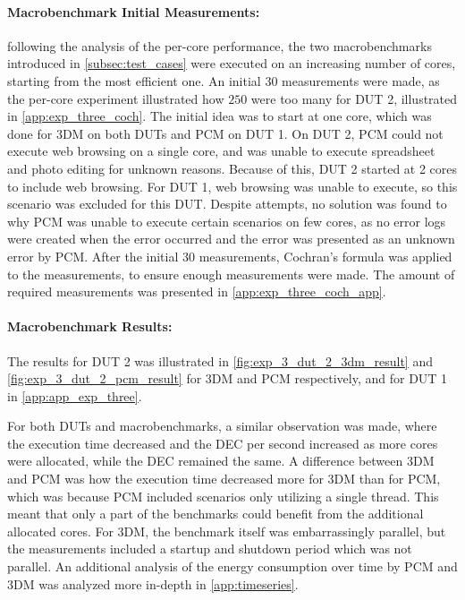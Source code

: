 \paragraph*{Macrobenchmark Initial Measurements:} following the analysis of the per-core performance, the two macrobenchmarks introduced in \cref{subsec:test_cases} were executed on an increasing number of cores, starting from the most efficient one. An initial $30$ measurements were made, as the per-core experiment illustrated how $250$ were too many for DUT 2, illustrated in \cref{app:exp_three_coch}. The initial idea was to start at one core, which was done for 3DM on both DUTs and PCM on DUT 1. On DUT 2, PCM could not execute web browsing on a single core, and was unable to execute spreadsheet and photo editing for unknown reasons. Because of this, DUT 2 started at 2 cores to include web browsing. For DUT 1, web browsing was unable to execute, so this scenario was excluded for this DUT. Despite attempts, no solution was found to why PCM was unable to execute certain scenarios on few cores, as no error logs were created when the error occurred and the error was presented as an unknown error by PCM. After the initial $30$ measurements, Cochran's formula was applied to the measurements, to ensure enough measurements were made. The amount of required measurements was presented in \cref{app:exp_three_coch_app}.



\paragraph*{Macrobenchmark Results:} The results for DUT 2 was illustrated in \cref{fig:exp_3_dut_2_3dm_result} and \cref{fig:exp_3_dut_2_pcm_result} for 3DM and PCM respectively, and for DUT 1 in \cref{app:app_exp_three}.

For both DUTs and macrobenchmarks, a similar observation was made, where the execution time decreased and the DEC per second increased as more cores were allocated, while the DEC remained the same. A difference between 3DM and PCM was how the execution time decreased more for 3DM than for PCM, which was because PCM included scenarios only utilizing a single thread. This meant that only a part of the benchmarks could benefit from the additional allocated cores. For 3DM, the benchmark itself was embarrassingly parallel, but the measurements included a startup and shutdown period which was not parallel. An additional analysis of the energy consumption over time by PCM and 3DM was analyzed more in-depth in \cref{app:timeseries}.

